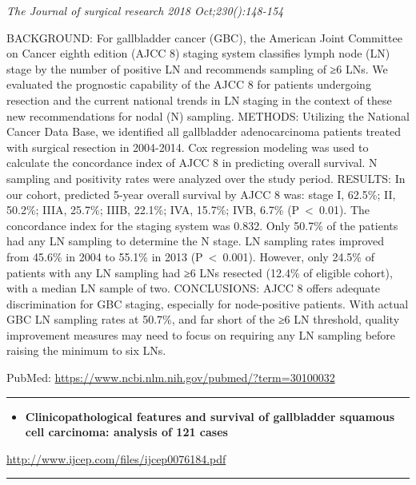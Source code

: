 \documentclass[]{article}
\providecommand{\tightlist}{%
  \setlength{\itemsep}{0pt}\setlength{\parskip}{0pt}}
\begin{document}
\emph{The Journal of surgical research 2018 Oct;230():148-154}

BACKGROUND: For gallbladder cancer (GBC), the American Joint Committee
on Cancer eighth edition (AJCC 8) staging system classifies lymph node
(LN) stage by the number of positive LN and recommends sampling of ≥6
LNs. We evaluated the prognostic capability of the AJCC 8 for patients
undergoing resection and the current national trends in LN staging in
the context of these new recommendations for nodal (N) sampling.
METHODS: Utilizing the National Cancer Data Base, we identified all
gallbladder adenocarcinoma patients treated with surgical resection in
2004-2014. Cox regression modeling was used to calculate the concordance
index of AJCC 8 in predicting overall survival. N sampling and
positivity rates were analyzed over the study period. RESULTS: In our
cohort, predicted 5-year overall survival by AJCC 8 was: stage I,
62.5\%; II, 50.2\%; IIIA, 25.7\%; IIIB, 22.1\%; IVA, 15.7\%; IVB, 6.7\%
(P~\textless{}~0.01). The concordance index for the staging system was
0.832. Only 50.7\% of the patients had any LN sampling to determine the
N stage. LN sampling rates improved from 45.6\% in 2004 to 55.1\% in
2013 (P~\textless{}~0.001). However, only 24.5\% of patients with any LN
sampling had ≥6 LNs resected (12.4\% of eligible cohort), with a median
LN sample of two. CONCLUSIONS: AJCC 8 offers adequate discrimination for
GBC staging, especially for node-positive patients. With actual GBC LN
sampling rates at 50.7\%, and far short of the ≥6 LN threshold, quality
improvement measures may need to focus on requiring any LN sampling
before raising the minimum to six LNs.

PubMed: \url{https://www.ncbi.nlm.nih.gov/pubmed/?term=30100032}

{}

{}

\begin{center}\rule{0.5\linewidth}{\linethickness}\end{center}

\begin{itemize}
\tightlist
\item
  \textbf{Clinicopathological features and survival of gallbladder
  squamous cell carcinoma: analysis of 121 cases}
\end{itemize}

\url{http://www.ijcep.com/files/ijcep0076184.pdf}

\begin{center}\rule{0.5\linewidth}{\linethickness}\end{center}
\end{document}
